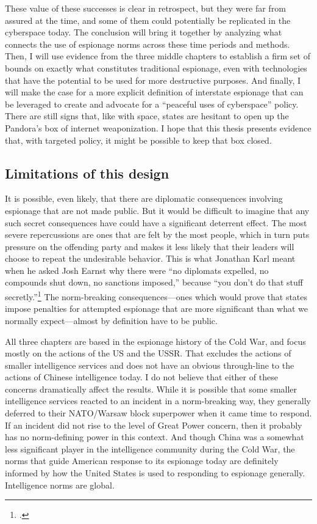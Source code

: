 \documentclass{memoir}
\begin{document}
\begin{refsegment}
These value of these successes is clear in retrospect, but they were far from assured at the time, and some of them could potentially be replicated in the cyberspace today. The conclusion will bring it together by analyzing what connects the use of espionage norms across these time periods and methods. Then, I will use evidence from the three middle chapters to establish a firm set of bounds on exactly what constitutes traditional espionage, even with technologies that have the potential to be used for more destructive purposes. And finally, I will make the case for a more explicit definition of interstate espionage that can be leveraged to create and advocate for a ``peaceful uses of cyberspace'' policy. There are still signs that, like with space, states are hesitant to open up the Pandora's box of internet weaponization. I hope that this thesis presents evidence that, with targeted policy, it might be possible to keep that box closed.

\subsection{Limitations of this design}
It is possible, even likely, that there are diplomatic consequences involving espionage that are not made public. But it would be difficult to imagine that any such secret consequences have could have a significant deterrent effect.  The most severe repercussions are ones that are felt by the most people, which in turn puts pressure on the offending party and makes it less likely that their leaders will choose to repeat the undesirable behavior. This is what Jonathan Karl meant when he asked Josh Earnst why there were ``no diplomats expelled, no compounds shut down, no sanctions imposed,'' because ``you don't do that stuff secretly.''\footcite{earnest_press_2017} The norm-breaking consequences---ones which would prove that states impose penalties for attempted espionage that are more significant than what we normally expect---almost by definition have to be public.

All three chapters are based in the espionage history of the Cold War, and focus mostly on the actions of the US and the USSR. That excludes the actions of smaller intelligence services and does not have an obvious through-line to the actions of Chinese intelligence today. I do not believe that either of these concerns dramatically affect the results. While it is possible that some smaller intelligence services reacted to an incident in a norm-breaking way, they generally deferred to their NATO/Warsaw block superpower when it came time to respond. If an incident did not rise to the level of Great Power concern, then it probably has no norm-defining power in this context. And though China was a somewhat less significant player in the intelligence community during the Cold War, the norms that guide American response to its espionage today are definitely informed by how the United States is used to responding to espionage generally. Intelligence norms are global.


\end{refsegment}
\end{document}

